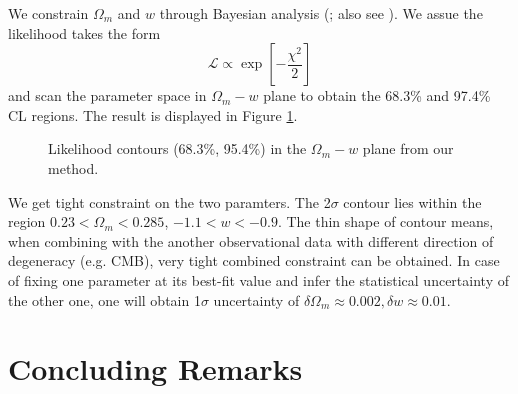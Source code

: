 \documentclass[iop]{emulateapj}
\begin{document}
We constrain $\Omega_m$ and $w$ through Bayesian analysis (\cite{Bayesian}; also see \cite{LB2002,Li2016}).
We assue the likelihood takes the form
\begin{equation}
 \mathcal{L} \propto \exp\left[-\frac{\chi^2}{2}\right]
\end{equation}
and scan the parameter space in $\Omega_m-w$ plane to obtain the 68.3\% and 97.4\% CL regions.
The result is displayed in Figure \ref{fig_contours}.


\begin{figure}
   \caption{\label{fig_contours}
   Likelihood contours (68.3\%, 95.4\%) in the $\Omega_m-w$ plane from our method.
   }
\end{figure}

We get tight constraint on the two paramters.
The 2$\sigma$ contour lies within the region $0.23<\Omega_m<0.285$, $-1.1<w<-0.9$.
The thin shape of contour means, when combining with the another observational data with different direction of degeneracy (e.g. CMB),
very tight combined constraint can be obtained.
In case of fixing one parameter at its best-fit value and infer the statistical uncertainty of the other one,
one will obtain 1$\sigma$ uncertainty of $\delta\Omega_m\approx0.002,\delta w\approx0.01$. 


\section{Concluding Remarks}
 
\end{document}
